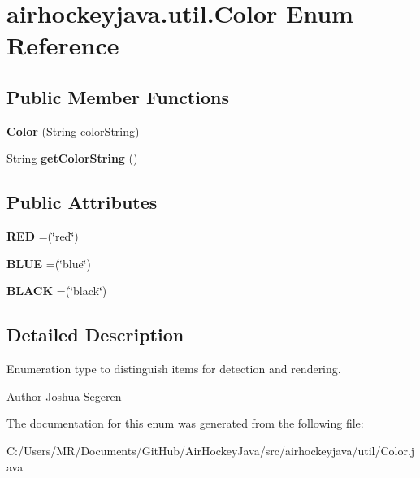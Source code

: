 \hypertarget{enumairhockeyjava_1_1util_1_1_color}{}\section{airhockeyjava.\+util.\+Color Enum Reference}
\label{enumairhockeyjava_1_1util_1_1_color}
\subsection*{Public Member Functions}
\begin{DoxyCompactItemize}
\item 
\hypertarget{enumairhockeyjava_1_1util_1_1_color_a21283c8ca4dba4ab6af339bee2af5118}{}{\bfseries Color} (String color\+String)\label{enumairhockeyjava_1_1util_1_1_color_a21283c8ca4dba4ab6af339bee2af5118}

\item 
\hypertarget{enumairhockeyjava_1_1util_1_1_color_a4e201ddb02792b3ee03e15a3e055a3b7}{}String {\bfseries get\+Color\+String} ()\label{enumairhockeyjava_1_1util_1_1_color_a4e201ddb02792b3ee03e15a3e055a3b7}

\end{DoxyCompactItemize}
\subsection*{Public Attributes}
\begin{DoxyCompactItemize}
\item 
\hypertarget{enumairhockeyjava_1_1util_1_1_color_ae5c174c62fa96f86c38062ba20e44baa}{}{\bfseries R\+E\+D} =(\char`\"{}red\char`\"{})\label{enumairhockeyjava_1_1util_1_1_color_ae5c174c62fa96f86c38062ba20e44baa}

\item 
\hypertarget{enumairhockeyjava_1_1util_1_1_color_a82f603aeb3fadd6af831ac8953cff160}{}{\bfseries B\+L\+U\+E} =(\char`\"{}blue\char`\"{})\label{enumairhockeyjava_1_1util_1_1_color_a82f603aeb3fadd6af831ac8953cff160}

\item 
\hypertarget{enumairhockeyjava_1_1util_1_1_color_a88fea0104452124d1b29d155d246d7a3}{}{\bfseries B\+L\+A\+C\+K} =(\char`\"{}black\char`\"{})\label{enumairhockeyjava_1_1util_1_1_color_a88fea0104452124d1b29d155d246d7a3}

\end{DoxyCompactItemize}


\subsection{Detailed Description}
Enumeration type to distinguish items for detection and rendering. \begin{DoxyAuthor}{Author}
Joshua Segeren 
\end{DoxyAuthor}


The documentation for this enum was generated from the following file\+:\begin{DoxyCompactItemize}
\item 
C\+:/\+Users/\+M\+R/\+Documents/\+Git\+Hub/\+Air\+Hockey\+Java/src/airhockeyjava/util/Color.\+java\end{DoxyCompactItemize}
